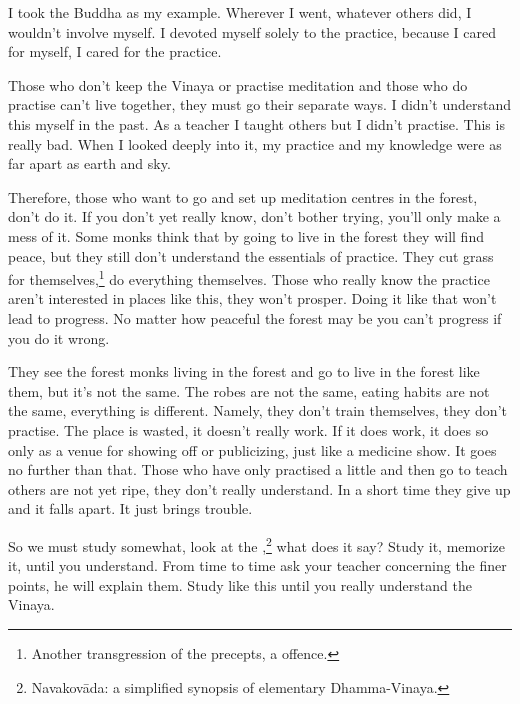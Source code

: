 I took the Buddha as my example. Wherever I went, whatever others did, I wouldn't involve myself. I devoted myself solely to the practice, because I cared for myself, I cared for the practice.

Those who don't keep the Vinaya or practise meditation and those who do practise can't live together, they must go their separate ways. I didn't understand this myself in the past. As a teacher I taught others but I didn't practise. This is really bad. When I looked deeply into it, my practice and my knowledge were as far apart as earth and sky.

Therefore, those who want to go and set up meditation centres in the forest, don't do it. If you don't yet really know, don't bother trying, you'll only make a mess of it. Some monks think that by going to live in the forest they will find peace, but they still don't understand the essentials of practice. They cut grass for themselves,\footnote{Another transgression of the precepts, a  offence.} do everything themselves. Those who really know the practice aren't interested in places like this, they won't prosper. Doing it like that won't lead to progress. No matter how peaceful the forest may be you can't progress if you do it wrong.

They see the forest monks living in the forest and go to live in the forest like them, but it's not the same. The robes are not the same, eating habits are not the same, everything is different. Namely, they don't train themselves, they don't practise. The place is wasted, it doesn't really work. If it does work, it does so only as a venue for showing off or publicizing, just like a medicine show. It goes no further than that. Those who have only practised a little and then go to teach others are not yet ripe, they don't really understand. In a short time they give up and it falls apart. It just brings trouble.

So we must study somewhat, look at the ,\footnote{Navakov\=ada: a simplified synopsis of elementary Dhamma-Vinaya.} what does it say? Study it, memorize it, until you understand. From time to time ask your teacher concerning the finer points, he will explain them. Study like this until you really understand the Vinaya.

